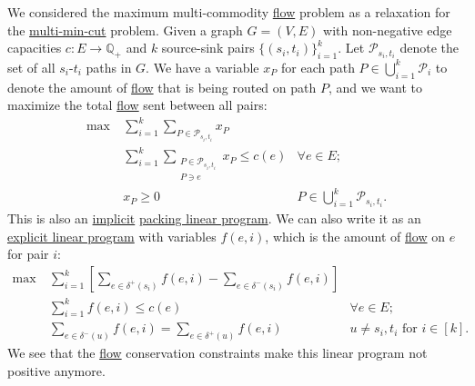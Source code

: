 \begin{eg}\label{eg:maximum-multi-commodity-flow-MWU}
	We considered the maximum multi-commodity \hyperref[def:flow]{flow} problem as a relaxation for the \hyperref[prb:multi-min-cut]{multi-min-cut} problem. Given a graph \(G = (V, E)\) with non-negative edge capacities \(c \colon E \to \mathbb{Q} _{+}\) and \(k\) source-sink pairs \(\{ (s_i, t_i) \} _{i=1}^{k}\). Let \(\mathcal{P} _{s_i, t_i}\) denote the set of all \(s_i\)-\(t_i\) paths in \(G\). We have a variable \(x_P\) for each path \(P \in \bigcup_{i=1}^{k} \mathcal{P} _i\) to denote the amount of \hyperref[def:flow]{flow} that is being routed on path \(P\), and we want to maximize the total \hyperref[def:flow]{flow} sent between all pairs:
	\[
		\begin{aligned}
			\max~ & \sum_{i=1}^{k} \sum_{P \in \mathcal{P} _{s_i, t_i}} x_P                                                         \\
			      & \sum_{i=1}^{k} \sum_{\substack{P \in\mathcal{P} _{s_i, t_i}                                                     \\ P \ni e}} x_P \leq c(e) & \forall e \in E ;                                  \\
			      & x_P \geq 0                                                  & P \in \bigcup_{i=1}^{k} \mathcal{P} _{s_i, t_i} .
		\end{aligned}
	\]
	This is also an \hyperref[def:implicit-LP]{implicit} \hyperref[def:packing-LP]{packing linear program}. We can also write it as an \hyperref[def:explicit-LP]{explicit linear program} with variables \(f(e, i)\), which is the amount of \hyperref[def:flow]{flow} on \(e\) for pair \(i\):
	\[
		\begin{aligned}
			\max~ & \sum_{i=1}^{k} \left[ \sum_{e \in \delta ^+ (s_i) } f(e, i) - \sum_{e \in \delta ^- (s_i) } f(e, i) \right]                                           \\
			      & \sum_{i=1}^{k} f(e, i) \leq c(e)                                                                            & \forall e \in E ;                       \\
			      & \sum_{e \in \delta ^-(u)} f(e, i) = \sum_{e \in \delta ^+(u)} f(e, i)                                       & u \neq s_i, t_i \text{ for } i \in [k].
		\end{aligned}
	\]
	We see that the \hyperref[def:flow]{flow} conservation constraints make this linear program not positive anymore.
\end{eg}

